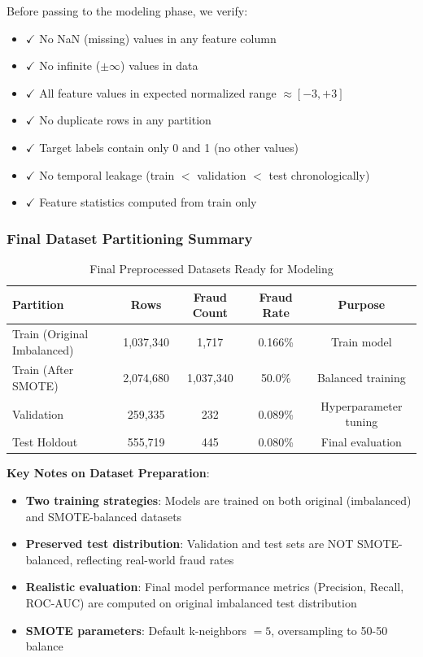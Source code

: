 Before passing to the modeling phase, we verify:
\begin{itemize}
    \item $\checkmark$ No NaN (missing) values in any feature column
    \item $\checkmark$ No infinite ($\pm \infty$) values in data
    \item $\checkmark$ All feature values in expected normalized range $\approx [-3, +3]$
    \item $\checkmark$ No duplicate rows in any partition
    \item $\checkmark$ Target labels contain only 0 and 1 (no other values)
    \item $\checkmark$ No temporal leakage (train $<$ validation $<$ test chronologically)
    \item $\checkmark$ Feature statistics computed from train only
\end{itemize}

\subsubsection{Final Dataset Partitioning Summary}

\begin{table}[H]
\centering
\caption{Final Preprocessed Datasets Ready for Modeling}
\begin{tabular}{|l|c|c|c|c|}
\hline
\textbf{Partition} & \textbf{Rows} & \textbf{Fraud Count} & \textbf{Fraud Rate} & \textbf{Purpose} \\
\hline
Train (Original Imbalanced) & 1,037,340 & 1,717 & 0.166\% & Train model \\
\hline
Train (After SMOTE) & 2,074,680 & 1,037,340 & 50.0\% & Balanced training \\
\hline
Validation & 259,335 & 232 & 0.089\% & Hyperparameter tuning \\
\hline
Test Holdout & 555,719 & 445 & 0.080\% & Final evaluation \\
\hline
\end{tabular}
\end{table}

\textbf{Key Notes on Dataset Preparation}:

\begin{itemize}
    \item \textbf{Two training strategies}: Models are trained on both original (imbalanced) and SMOTE-balanced datasets
    \item \textbf{Preserved test distribution}: Validation and test sets are NOT SMOTE-balanced, reflecting real-world fraud rates
    \item \textbf{Realistic evaluation}: Final model performance metrics (Precision, Recall, ROC-AUC) are computed on original imbalanced test distribution
    \item \textbf{SMOTE parameters}: Default k-neighbors $= 5$, oversampling to 50-50 balance
\end{itemize}